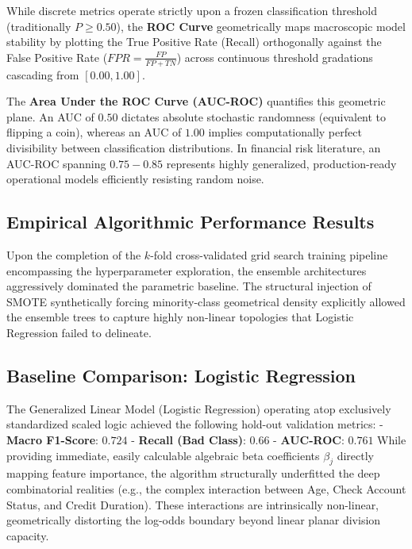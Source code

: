 While discrete metrics operate strictly upon a frozen classification
threshold (traditionally \(P \ge 0.50\)), the \textbf{ROC Curve}
geometrically maps macroscopic model stability by plotting the True
Positive Rate (Recall) orthogonally against the False Positive Rate
(\(FPR = \frac{FP}{FP + TN}\)) across continuous threshold gradations
cascading from \([0.00, 1.00]\).

The \textbf{Area Under the ROC Curve (AUC-ROC)} quantifies this
geometric plane. An AUC of \(0.50\) dictates absolute stochastic
randomness (equivalent to flipping a coin), whereas an AUC of \(1.00\)
implies computationally perfect divisibility between classification
distributions. In financial risk literature, an AUC-ROC spanning
\(0.75 - 0.85\) represents highly generalized, production-ready
operational models efficiently resisting random noise.

\hypertarget{empirical-algorithmic-performance-results}{%
\subsection{Empirical Algorithmic Performance
Results}\label{empirical-algorithmic-performance-results}}

Upon the completion of the \(k\)-fold cross-validated grid search
training pipeline encompassing the hyperparameter exploration, the
ensemble architectures aggressively dominated the parametric baseline.
The structural injection of SMOTE synthetically forcing minority-class
geometrical density explicitly allowed the ensemble trees to capture
highly non-linear topologies that Logistic Regression failed to
delineate.

\hypertarget{baseline-comparison-logistic-regression}{%
\subsection{Baseline Comparison: Logistic
Regression}\label{baseline-comparison-logistic-regression}}

The Generalized Linear Model (Logistic Regression) operating atop
exclusively standardized scaled logic achieved the following hold-out
validation metrics: - \textbf{Macro F1-Score}: \(0.724\) -
\textbf{Recall (Bad Class)}: \(0.66\) - \textbf{AUC-ROC}: \(0.761\)
While providing immediate, easily calculable algebraic beta coefficients
\(\beta_j\) directly mapping feature importance, the algorithm
structurally underfitted the deep combinatorial realities (e.g., the
complex interaction between Age, Check Account Status, and Credit
Duration). These interactions are intrinsically non-linear,
geometrically distorting the log-odds boundary beyond linear planar
division capacity.

